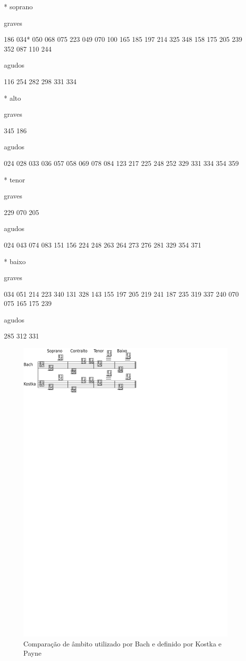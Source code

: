 \documentclass{article}
\begin{document}
* soprano

graves

186 034* 050 068 075 223 049 070 100 165 185 197 214 325 348 158 175
205 239 352 087 110 244

agudos

116 254 282 298 331 334

* alto

graves

345 186

agudos

024 028 033 036 057 058 069 078 084 123 217 225 248 252 329 331 334
354 359

* tenor

graves

229 070 205

agudos

024 043 074 083 151 156 224 248 263 264 273 276 281 329 354 371

* baixo

graves

034 051 214 223 340 131 328 143 155 197 205 219 241 187 235 319 337
240 070 075 165 175 239

agudos

285 312 331

\begin{figure}
  \centering
  \includegraphics[scale=2.5]{ambitos}
  \caption{Comparação de âmbito utilizado por Bach e definido por
    Kostka e Payne}
  \label{fig:ambito-kostka}
\end{figure}
\end{document}
